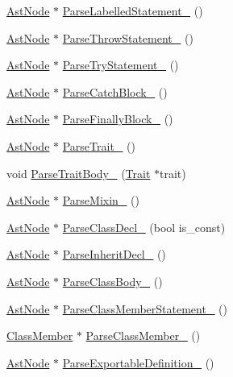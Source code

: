 \begin{DoxyCompactItemize}
\item 
\hyperlink{classmocha_1_1_ast_node}{AstNode} $\ast$ \hyperlink{classmocha_1_1_parser_a533a9836a013b15be6ddd959c57406f8}{ParseLabelledStatement\_\-} ()
\item 
\hyperlink{classmocha_1_1_ast_node}{AstNode} $\ast$ \hyperlink{classmocha_1_1_parser_ad87e9e68a8c03c87661ff354ed3f74f4}{ParseThrowStatement\_\-} ()
\item 
\hyperlink{classmocha_1_1_ast_node}{AstNode} $\ast$ \hyperlink{classmocha_1_1_parser_ac2a45125b3a10222f649d25bd2c584e6}{ParseTryStatement\_\-} ()
\item 
\hyperlink{classmocha_1_1_ast_node}{AstNode} $\ast$ \hyperlink{classmocha_1_1_parser_a5715daf4df01fdbced0cb3fb3c2d8ef0}{ParseCatchBlock\_\-} ()
\item 
\hyperlink{classmocha_1_1_ast_node}{AstNode} $\ast$ \hyperlink{classmocha_1_1_parser_a4ceb0a70bed8258f8f9e53511a554a08}{ParseFinallyBlock\_\-} ()
\item 
\hyperlink{classmocha_1_1_ast_node}{AstNode} $\ast$ \hyperlink{classmocha_1_1_parser_a0a425972163a01d62980c50057efc004}{ParseTrait\_\-} ()
\item 
void \hyperlink{classmocha_1_1_parser_a82e66320dae5600aae5620a1295cd262}{ParseTraitBody\_\-} (\hyperlink{classmocha_1_1_trait}{Trait} $\ast$trait)
\item 
\hyperlink{classmocha_1_1_ast_node}{AstNode} $\ast$ \hyperlink{classmocha_1_1_parser_a47ff5b34b98f66b1b4103e9fbee92702}{ParseMixin\_\-} ()
\item 
\hyperlink{classmocha_1_1_ast_node}{AstNode} $\ast$ \hyperlink{classmocha_1_1_parser_addc502dcf5fed6496f0bb22c71bd3c21}{ParseClassDecl\_\-} (bool is\_\-const)
\item 
\hyperlink{classmocha_1_1_ast_node}{AstNode} $\ast$ \hyperlink{classmocha_1_1_parser_aaf3c5b53f37c5a8a6842a02d8473542c}{ParseInheritDecl\_\-} ()
\item 
\hyperlink{classmocha_1_1_ast_node}{AstNode} $\ast$ \hyperlink{classmocha_1_1_parser_a17c8ba6a70329ae01f5c40d5a5eb13c2}{ParseClassBody\_\-} ()
\item 
\hyperlink{classmocha_1_1_ast_node}{AstNode} $\ast$ \hyperlink{classmocha_1_1_parser_a30c1e53407476acdcdebf1fdfdc325a4}{ParseClassMemberStatement\_\-} ()
\item 
\hyperlink{classmocha_1_1_class_member}{ClassMember} $\ast$ \hyperlink{classmocha_1_1_parser_af113cc4062e83d83c45df549e91f026e}{ParseClassMember\_\-} ()
\item 
\hyperlink{classmocha_1_1_ast_node}{AstNode} $\ast$ \hyperlink{classmocha_1_1_parser_a6f802e6c8c4118a8b872a2250a1dfd82}{ParseExportableDefinition\_\-} ()

\end{DoxyCompactItemize}

